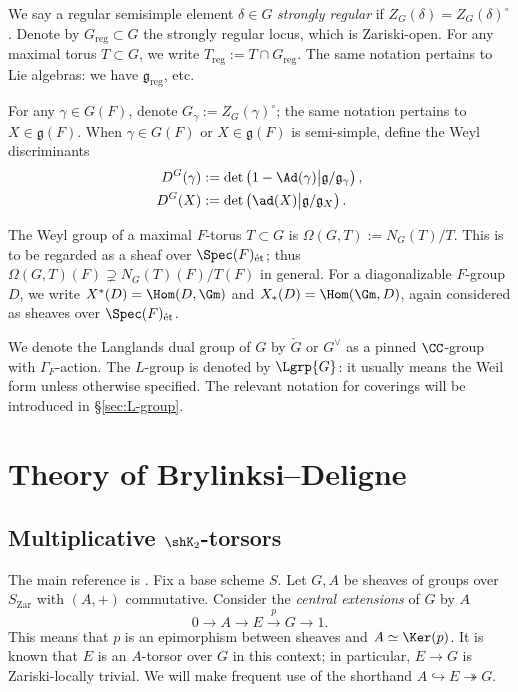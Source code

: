 \documentclass[a4paper,10pt]{article}
\begin{document}
We say a regular semisimple element $\delta \in G$ \emph{strongly regular} if $Z_G(\delta) = Z_G(\delta)^\circ$. Denote by $G_\text{reg} \subset G$ the strongly regular locus, which is Zariski-open. For any maximal torus $T \subset G$, we write $T_\text{reg} := T \cap G_\text{reg}$. The same notation pertains to Lie algebras: we have $\mathfrak{g}_\text{reg}$, etc.

For any $\gamma \in G(F)$, denote $G_\gamma := Z_G(\gamma)^\circ$; the same notation pertains to $X \in \mathfrak{g}(F)$. When $\gamma \in G(F)$ or $X \in \mathfrak{g}(F)$ is semi-simple, define the Weyl discriminants
\begin{align*}
	D^G(\gamma) & := \det\left( 1 - \Ad(\gamma) \big| \mathfrak{g}/\mathfrak{g}_\gamma \right), \\
	D^G(X) & := \det\left( \ad(X) \big| \mathfrak{g}/\mathfrak{g}_X \right).
\end{align*}

The Weyl group of a maximal $F$-torus $T \subset G$ is $\Omega(G,T) := N_G(T)/T$. This is to be regarded as a sheaf over $\Spec(F)_\text{ét}$; thus $\Omega(G,T)(F) \supsetneq N_G(T)(F)/T(F)$ in general. For a diagonalizable $F$-group $D$, we write $X^*(D) = \Hom(D, \Gm)$ and $X_*(D) = \Hom(\Gm, D)$, again considered as sheaves over $\Spec(F)_\text{ét}$.

We denote the Langlands dual group of $G$ by $\check{G}$ or $G^\vee$ as a pinned $\CC$-group with $\Gamma_F$-action. The $L$-group is denoted by $\Lgrp{G}$: it usually means the Weil form unless otherwise specified. The relevant notation for coverings will be introduced in \S\ref{sec:L-group}.

\section{Theory of Brylinksi--Deligne}\label{sec:BD-theory}
\subsection{Multiplicative \texorpdfstring{$\shK_2$-torsors}{K2-torsors}}\label{sec:torsors-generalities}
The main reference is \cite{BD01}. Fix a base scheme $S$. Let $G, A$ be sheaves of groups over $S_\text{Zar}$ with $(A,+)$ commutative. Consider the \emph{central extensions} of $G$ by $A$
\[ 0 \to A \to E \stackrel{p}{\to} G \to 1. \]
This means that $p$ is an epimorphism between sheaves and $A \simeq \Ker(p)$. It is known \cite[Exp VII, 1.1.2]{SGA7-1} that $E$ is an $A$-torsor over $G$ in this context; in particular, $E \to G$ is Zariski-locally trivial. We will make frequent use of the shorthand $A \hookrightarrow E \twoheadrightarrow G$. %
\end{document}
